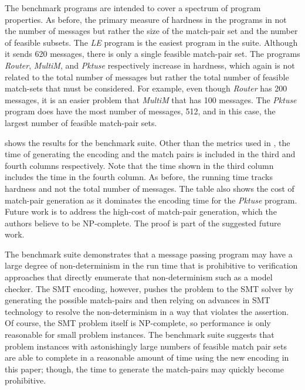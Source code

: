The benchmark programs are intended to cover a spectrum of program properties. As before, the primary measure of hardness in the programs in not the number of messages but rather the size of the match-pair set and the number of feasible subsets.  The \textit{LE} program is the easiest program in the suite. Although it sends 620 messages, there is only a single feasible match-pair set. The programs \textit{Router}, \textit{MultiM}, and \textit{Pktuse} respectively increase in hardness, which again is not related to the total number of messages but rather the total number of feasible match-sets that must be considered. For example, even though \textit{Router} has 200 messages, it is an easier problem that \textit{MultiM} that has 100 messages. The \textit{Pktuse} program does have the most number of messages, 512, and in this case, the largest number of feasible match-pair sets.

 shows the results for the benchmark suite. Other than the metrics used in , the time of generating the encoding and the match pairs is included in the third and fourth columns respectively. Note that the time shown in the third column includes the time in the fourth column. As before, the running time tracks hardness and not the total number of messages. The table also shows the cost of match-pair generation as it dominates the encoding time for the \textit{Pktuse} program. Future work is to address the high-cost of match-pair generation, which the authors believe to be NP-complete. The proof is part of the suggested future work.

The benchmark suite demonstrates that a message passing program may have a large degree of non-determinism in the run time that is prohibitive to verification approaches that directly enumerate that non-determinism such as a model checker. The SMT encoding, however, pushes the problem to the SMT solver by generating the possible match-pairs and then relying on advances in SMT technology to resolve the non-determinism in a way that violates the assertion. Of course, the SMT problem itself is NP-complete, so performance is only reasonable for small problem instances. The benchmark suite suggests that problem instances with astonishingly large numbers of feasible match pair sets are able to complete in a reasonable amount of time using the new encoding in this paper; though, the time to generate the match-pairs may quickly become prohibitive.

